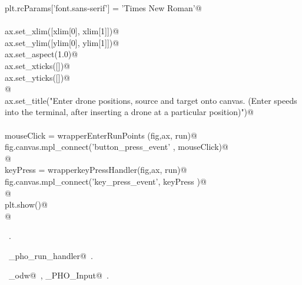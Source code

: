 \documentclass[12.0pt]{report}
\begin{document}
\begin{flushleft}
\begin{list}{}{}
\mbox{}\verb@    plt.rcParams['font.sans-serif'] = 'Times New Roman'@\\
\mbox{}\verb@@\\
\mbox{}\verb@    ax.set_xlim([xlim[0], xlim[1]])@\\
\mbox{}\verb@    ax.set_ylim([ylim[0], ylim[1]])@\\
\mbox{}\verb@    ax.set_aspect(1.0)@\\
\mbox{}\verb@    ax.set_xticks([])@\\
\mbox{}\verb@    ax.set_yticks([])@\\
\mbox{}\verb@          @\\
\mbox{}\verb@    ax.set_title("Enter drone positions, source and target onto canvas. \n (Enter speeds into the terminal, after inserting a drone at a particular position)")@\\
\mbox{}\verb@@\\
\mbox{}\verb@    mouseClick   = wrapperEnterRunPoints (fig,ax, run)@\\
\mbox{}\verb@    fig.canvas.mpl_connect('button_press_event' , mouseClick)@\\
\mbox{}\verb@          @\\
\mbox{}\verb@    keyPress     = wrapperkeyPressHandler(fig,ax, run)@\\
\mbox{}\verb@    fig.canvas.mpl_connect('key_press_event', keyPress   )@\\
\mbox{}\verb@    @\\
\mbox{}\verb@    plt.show()@\\
\mbox{}\verb@    @\\
\mbox{}\verb@@{\NWsep}
\end{list}
\vspace{-1.5ex}
\footnotesize
\begin{list}{}{\setlength{\itemsep}{-\parsep}\setlength{\itemindent}{-\leftmargin}}
\item \NWtxtMacroRefIn\ .
\item \NWtxtIdentsDefed\nobreak\  \verb@single_pho_run_handler@\nobreak\ .\item \NWtxtIdentsUsed\nobreak\  \verb@algo_odw@\nobreak\ , \verb@Single_PHO_Input@\nobreak\ .
\item{}
\end{list}
\vspace{4ex}
\end{flushleft}
\end{document}
